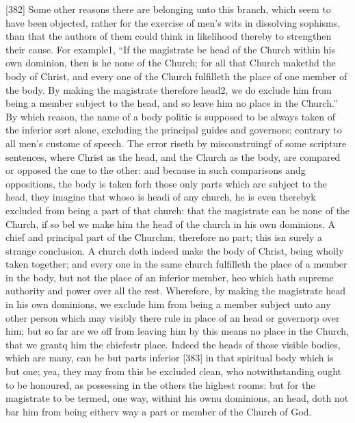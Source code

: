 [382]
Some other reasons there are belonging unto this branch, which seem to have been objected, rather for the exercise of men’s wits in dissolving sophisms, than that the authors of them could think in likelihood thereby to strengthen their cause. For example1, “If the magistrate be head of the Church within his own dominion, then is he none of the Church; for all that Church makethd the body of Christ, and every one of the Church fulfilleth the place of one member of the body. By making the magistrate therefore head2, we do exclude him from being a member subject to the head, and so leave him no place in the Church.” By which reason, the name of a body politic is supposed to be always taken of the inferior sort alone, excluding the principal guides and governors; contrary to all men’s custome of speech. The error riseth by misconstruingf of some scripture sentences, where Christ as the head, and the Church as the body, are compared or opposed the one to the other: and because in such comparisons andg oppositions, the body is taken forh those only parts which are subject to the head, they imagine that whoso is headi of any church, he is even therebyk excluded from being a part of that church: that the magistrate can be none of the Church, if so bel we make him the head of the church in his own dominions. A chief and principal part of the Churchm, therefore no part; this isn surely a strange conclusion. A church doth indeed make the body of Christ, being wholly taken together; and every one in the same church fulfilleth the place of a member in the body, but not the place of an inferior member, heo which hath supreme authority and power over all the rest. Wherefore, by making the magistrate head in his own dominions, we exclude him from being a member subject unto any other person which may visibly there rule in place of an head or governorp over him; but so far are we off from leaving him by this means no place in the Church, that we grantq him the chiefestr place. Indeed the heads of those visible bodies, which are many, can be but parts inferior [383] in that spiritual body which is but one; yea, they may from this be excluded clean, who notwithstanding ought to be honoured, as possessing in the others the highest rooms: but for the magistrate to be termed, one way, withint his ownu dominions, an head, doth not bar him from being eitherv way a part or member of the Church of God.


